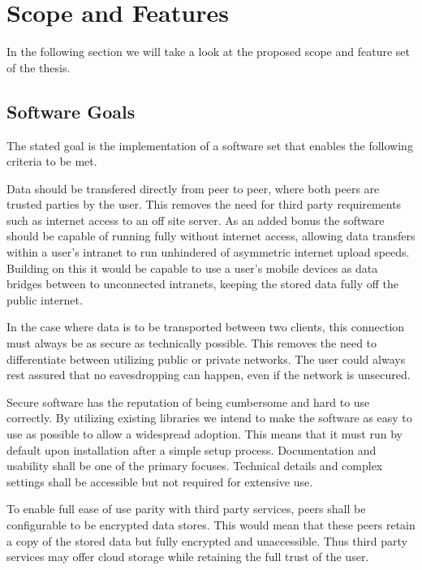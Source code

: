 \documentclass[a4paper,10pt,twoside]{article}
\begin{document}
\section{Scope and Features}

In the following section we will take a look at the proposed scope and feature set of the thesis.

\subsection{Software Goals}

The stated goal is the implementation of a software set that enables the following criteria to be met.

\begin{description}[leftmargin=2em,style=nextline,noitemsep,nolistsep]
\item[Peer to peer]
	Data should be transfered directly from peer to peer, where both peers are trusted parties by the user.
	This removes the need for third party requirements such as internet access to an off site server.
	As an added bonus the software should be capable of running fully without internet access, allowing data transfers within a user's intranet to run unhindered of asymmetric internet upload speeds.
	Building on this it would be capable to use a user's mobile devices as data bridges between to unconnected intranets, keeping the stored data fully off the public internet.
\item[Secure transport]
	In the case where data is to be transported between two clients, this connection must always be as secure as technically possible.
	This removes the need to differentiate between utilizing public or private networks.
	The user could always rest assured that no eavesdropping can happen, even if the network is unsecured.
\item[Focus on ease of use]
	Secure software has the reputation of being cumbersome and hard to use correctly.
	By utilizing existing libraries we intend to make the software as easy to use as possible to allow a widespread adoption.
	This means that it must run by default upon installation after a simple setup process.
	Documentation and usability shall be one of the primary focuses.
	Technical details and complex settings shall be accessible but not required for extensive use.
\item[Encrypted third party capability]
	To enable full ease of use parity with third party services, peers shall be configurable to be encrypted data stores.
	This would mean that these peers retain a copy of the stored data but fully encrypted and unaccessible.
	Thus third party services may offer cloud storage while retaining the full trust of the user.
\end{description}
\end{document}
